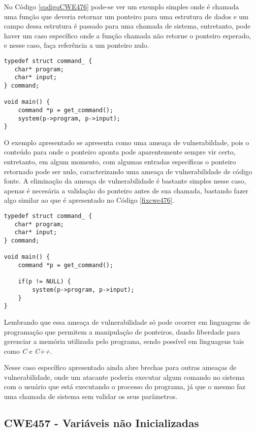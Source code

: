 No Código \ref{codigoCWE476} pode-se ver um exemplo simples onde é chamada uma
função que deveria retornar um ponteiro para uma estrutura de dados e um campo
dessa estrutura é passado para uma chamada de sistema, entretanto, pode haver um
caso específico onde a função chamada não retorne o ponteiro esperado, e nesse
caso, faça referência a um ponteiro nulo.

\begin{lstlisting}[caption={Código exemplo CWE476}, label=codigoCWE476]
typedef struct command_ {
   char* program;
   char* input;
} command;

void main() {
    command *p = get_command();
    system(p->program, p->input);
} 
\end{lstlisting}

O exemplo apresentado se apresenta como uma ameaça de vulnerabildade, pois o
conteúdo para onde o ponteiro aponta pode aparentemente sempre vir certo,
entretanto, em algum momento, com algumas entradas específicas o ponteiro
retornado pode ser nulo, caracterizando uma ameaça de vulnerabilidade de código
fonte. A eliminação da ameaça de vulnerabilidade é bastante simples nesse caso,
apenas é necesária a validação do ponteiro antes de sua chamada, bastando fazer
algo similar ao que é apresentado no Código \ref{fixcwe476}.

\begin{lstlisting}[caption={Evitando ameaça de vulnerabilidade CWE476},
label=fixcwe476]
typedef struct command_ {
   char* program;
   char* input;
} command;

void main() {
    command *p = get_command();

    if(p != NULL) {
        system(p->program, p->input);
    }
} 
\end{lstlisting}

Lembrando que essa ameaça de vulnerabilidade só pode ocorrer em linguagens de
programação que permitem a manipulação de ponteiros, dando liberdade para
gerenciar a memória utilizada pelo programa, sendo possível em linguagens tais
como \textit{C} e \textit{C++}.

Nesse caso específico apresentado ainda abre brechas para outras ameaças de
vulnerabilidade, onde um atacante poderia executar algum comando no sistema com
o usuário que está executando o processo do programa, já que o mesmo faz uma
chamada de sistema sem validar os seus parâmetros.

\subsection{CWE457 - Variáveis não Inicializadas}\label{cwe457}

